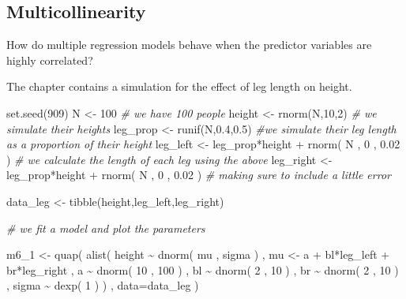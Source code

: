 \documentclass[
]{book}
\newenvironment{Shaded}{\begin{snugshade}}{\end{snugshade}}
\newcommand{\AttributeTok}[1]{\textcolor[rgb]{0.77,0.63,0.00}{#1}}
\newcommand{\CommentTok}[1]{\textcolor[rgb]{0.56,0.35,0.01}{\textit{#1}}}
\newcommand{\DecValTok}[1]{\textcolor[rgb]{0.00,0.00,0.81}{#1}}
\newcommand{\FloatTok}[1]{\textcolor[rgb]{0.00,0.00,0.81}{#1}}
\newcommand{\FunctionTok}[1]{\textcolor[rgb]{0.00,0.00,0.00}{#1}}
\newcommand{\NormalTok}[1]{#1}
\newcommand{\OtherTok}[1]{\textcolor[rgb]{0.56,0.35,0.01}{#1}}
\newcommand{\SpecialCharTok}[1]{\textcolor[rgb]{0.00,0.00,0.00}{#1}}
\begin{document}
\hypertarget{multicollinearity}{%
\subsection*{Multicollinearity}\label{multicollinearity}}

How do multiple regression models behave when the predictor variables are highly correlated?

The chapter contains a simulation for the effect of leg length on height.

\begin{Shaded}
\begin{Highlighting}[]
\FunctionTok{set.seed}\NormalTok{(}\DecValTok{909}\NormalTok{) }
\NormalTok{N }\OtherTok{\textless{}{-}} \DecValTok{100} \CommentTok{\# we have 100 people}
\NormalTok{height }\OtherTok{\textless{}{-}} \FunctionTok{rnorm}\NormalTok{(N,}\DecValTok{10}\NormalTok{,}\DecValTok{2}\NormalTok{) }\CommentTok{\# we simulate their heights}
\NormalTok{leg\_prop }\OtherTok{\textless{}{-}} \FunctionTok{runif}\NormalTok{(N,}\FloatTok{0.4}\NormalTok{,}\FloatTok{0.5}\NormalTok{) }\CommentTok{\#we simulate their leg length as a proportion of their height}
\NormalTok{leg\_left }\OtherTok{\textless{}{-}}\NormalTok{ leg\_prop}\SpecialCharTok{*}\NormalTok{height }\SpecialCharTok{+} \FunctionTok{rnorm}\NormalTok{( N , }\DecValTok{0}\NormalTok{ , }\FloatTok{0.02}\NormalTok{ ) }\CommentTok{\# we calculate the length of each leg using the above }
\NormalTok{leg\_right }\OtherTok{\textless{}{-}}\NormalTok{ leg\_prop}\SpecialCharTok{*}\NormalTok{height }\SpecialCharTok{+} \FunctionTok{rnorm}\NormalTok{( N , }\DecValTok{0}\NormalTok{ , }\FloatTok{0.02}\NormalTok{ ) }\CommentTok{\# making sure to include a little error}


\NormalTok{data\_leg }\OtherTok{\textless{}{-}} \FunctionTok{tibble}\NormalTok{(height,leg\_left,leg\_right)}

\CommentTok{\# we fit a model and plot the parameters}

\NormalTok{m6\_1 }\OtherTok{\textless{}{-}} \FunctionTok{quap}\NormalTok{( }
  \FunctionTok{alist}\NormalTok{(}
\NormalTok{    height }\SpecialCharTok{\textasciitilde{}} \FunctionTok{dnorm}\NormalTok{( mu , sigma ) , }
\NormalTok{    mu }\OtherTok{\textless{}{-}}\NormalTok{ a }\SpecialCharTok{+}\NormalTok{ bl}\SpecialCharTok{*}\NormalTok{leg\_left }\SpecialCharTok{+}\NormalTok{ br}\SpecialCharTok{*}\NormalTok{leg\_right , }
\NormalTok{    a }\SpecialCharTok{\textasciitilde{}} \FunctionTok{dnorm}\NormalTok{( }\DecValTok{10}\NormalTok{ , }\DecValTok{100}\NormalTok{ ) , }
\NormalTok{    bl }\SpecialCharTok{\textasciitilde{}} \FunctionTok{dnorm}\NormalTok{( }\DecValTok{2}\NormalTok{ , }\DecValTok{10}\NormalTok{ ) , }
\NormalTok{    br }\SpecialCharTok{\textasciitilde{}} \FunctionTok{dnorm}\NormalTok{( }\DecValTok{2}\NormalTok{ , }\DecValTok{10}\NormalTok{ ) , }
\NormalTok{    sigma }\SpecialCharTok{\textasciitilde{}} \FunctionTok{dexp}\NormalTok{( }\DecValTok{1}\NormalTok{ )}
\NormalTok{) , }\AttributeTok{data=}\NormalTok{data\_leg )}


\end{Highlighting}
\end{Shaded}
\end{document}
